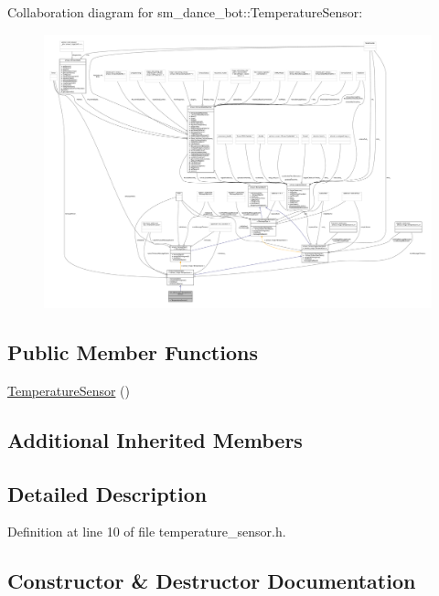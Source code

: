 Collaboration diagram for sm\+\_\+dance\+\_\+bot\+:\+:Temperature\+Sensor\+:
\nopagebreak
\begin{figure}[H]
\begin{center}
\leavevmode
\includegraphics[width=350pt]{classsm__dance__bot_1_1TemperatureSensor__coll__graph}
\end{center}
\end{figure}
\subsection*{Public Member Functions}
\begin{DoxyCompactItemize}
\item 
\hyperlink{classsm__dance__bot_1_1TemperatureSensor_ad7a445b65b3743d360cad0988b6c6aa1}{Temperature\+Sensor} ()
\end{DoxyCompactItemize}
\subsection*{Additional Inherited Members}


\subsection{Detailed Description}


Definition at line 10 of file temperature\+\_\+sensor.\+h.



\subsection{Constructor \& Destructor Documentation}
